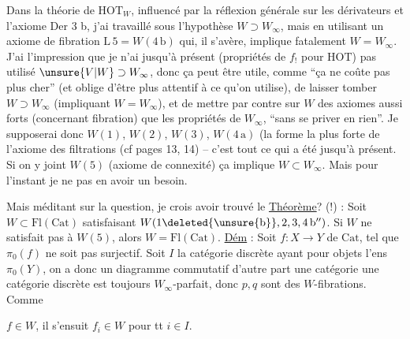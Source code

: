 Dans la théorie de $\mathrm{HOT}_W$, influencé par la réflexion générale sur les dérivateurs et l'axiome Der 3 b, j'ai travaillé sous l'hypothèse $W\supset W_\infty$, mais en utilisant un axiome de fibration $\mathrm L\,5=W(4\,\mathrm b)$ qui, il s'avère, implique fatalement $W=W_\infty$. J'ai l'impression que je n'ai jusqu'à présent (propriétés de $f_!$ pour $\mathrm{HOT}$) pas utilisé $\unsure{V|W}\supset W_\infty$, donc ça peut être utile, comme ``ça ne coûte pas plus cher'' (et oblige d'être plus attentif à ce qu'on utilise), de laisser tomber $W\supset W_\infty$   (impliquant $W=W_\infty$), et de mettre par contre sur $W$ des axiomes aussi forts (concernant  fibration) que les propriétés de $W_\infty$, ``sans se priver en rien''. Je supposerai donc $W(1)$, $W(2)$, $W(3)$, $W(4\,\mathrm a)$ (la forme la plus forte de l'axiome des filtrations (cf pages 13, 14) -- c'est tout ce qui a été  jusqu'à présent.  Si on y joint $W(5)$ (axiome de connexité) ça implique $W\subset W_\infty$. Mais pour l'instant je ne  pas en avoir un besoin. 

Mais méditant sur la question, je crois avoir trouvé le
 \uline{Théorème}? (!) : Soit $W\subset\mathrm{Fl}(\mathrm{Cat})$ satisfaisant $W(1\deleted{\unsure{\mathrm b}},2,3,4\,\mathrm b'')$. Si $W$ ne satisfait pas à $W(5)$, alors $W=\mathrm{Fl}(\mathrm{Cat})$.
 \uline{Dém} : Soit $f:X\longrightarrow Y$ de $\mathrm{Cat}$, tel que $\pi_0(f)$ ne soit pas surjectif. Soit $I$ la catégorie discrète ayant pour objets l'ens $\pi_0(Y)$, on a donc un diagramme commutatif  d'autre part  une catégorie  une catégorie discrète est toujours $W_\infty$-parfait, donc $p,q$ sont des $W$-fibrations. Comme


 $f\in W$, il s'ensuit $f_i\in W$ pour tt $i\in I$.

